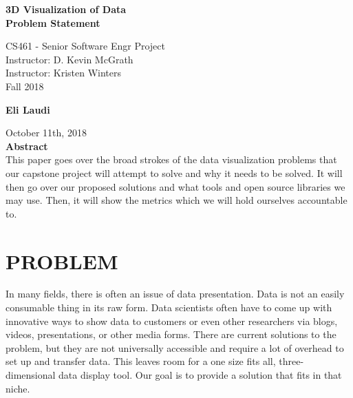 \documentclass[letterpaper,10pt,titlepage, onecolumn]{IEEEtran}
\begin{document}
\begin{titlepage}
\begin{center}
  
  \textbf{}

  \vspace{6cm}
  \Huge{}
  \textbf{3D Visualization of Data \\ Problem Statement}
  \vspace{3cm}

 
  \LARGE
  CS461 - Senior Software Engr Project\\
  \vspace{0.25cm}
  Instructor: D. Kevin McGrath \\
  Instructor: Kristen Winters \\
  \vspace{0.25cm}
  Fall 2018 \\
  \vspace{1.5cm}
  
  \textbf{Eli Laudi}
  \date{October 9th, 2018}
  \vfill
  October 11th, 2018\\
  \vspace{1cm}
  \vspace*{\fill}
  \textbf{Abstract} \\
  \normalsize
  This paper goes over the broad strokes of the data visualization problems that our capstone project will attempt to solve and why it needs to be solved. It will then go over our proposed solutions and what tools and open source libraries we may use. Then, it will show the metrics which we will hold ourselves accountable to.
  \end{center}
  \end{titlepage}
  
\section{PROBLEM}
In many fields, there is often an issue of data presentation. Data is not an easily consumable thing in its raw form. Data scientists often have to come up with innovative ways to show data to customers or even other researchers via blogs, videos, presentations, or other media forms. There are current solutions to the problem, but they are not universally accessible and require a lot of overhead to set up and transfer data. This leaves room for a one size fits all, three-dimensional data display tool. Our goal is to provide a solution that fits in that niche.
\end{document}
